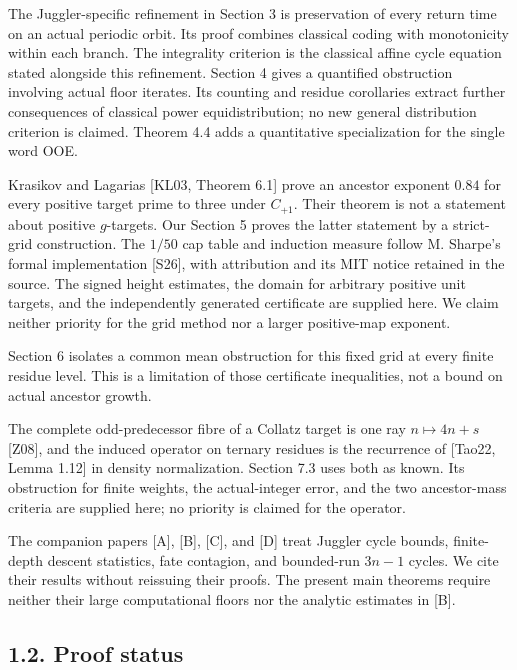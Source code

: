\documentclass[11pt,a4paper]{article}
\begin{document}
The Juggler-specific refinement in Section 3 is preservation of every
return time on an actual periodic orbit. Its proof combines classical
coding with monotonicity within each branch. The integrality criterion
is the classical affine cycle equation stated alongside this refinement.
Section 4 gives a quantified obstruction involving actual floor
iterates. Its counting and residue corollaries extract further
consequences of classical power equidistribution; no new general
distribution criterion is claimed. Theorem 4.4 adds a quantitative
specialization for the single word OOE.

Krasikov and Lagarias {[}KL03, Theorem 6.1{]} prove an ancestor exponent
\(0.84\) for every positive target prime to three under \(C_{+1}\).
Their theorem is not a statement about positive \(g\)-targets. Our
Section 5 proves the latter statement by a strict-grid construction. The
\(1/50\) cap table and induction measure follow M. Sharpe's formal
implementation {[}S26{]}, with attribution and its MIT notice retained
in the source. The signed height estimates, the domain for arbitrary
positive unit targets, and the independently generated certificate are
supplied here. We claim neither priority for the grid method nor a
larger positive-map exponent.

Section 6 isolates a common mean obstruction for this fixed grid at
every finite residue level. This is a limitation of those certificate
inequalities, not a bound on actual ancestor growth.

The complete odd-predecessor fibre of a Collatz target is one ray
\(n\mapsto4n+s\) {[}Z08{]}, and the induced operator on ternary residues
is the recurrence of {[}Tao22, Lemma 1.12{]} in density normalization.
Section 7.3 uses both as known. Its obstruction for finite weights, the
actual-integer error, and the two ancestor-mass criteria are supplied
here; no priority is claimed for the operator.

The companion papers {[}A{]}, {[}B{]}, {[}C{]}, and {[}D{]} treat
Juggler cycle bounds, finite-depth descent statistics, fate contagion,
and bounded-run \(3n-1\) cycles. We cite their results without reissuing
their proofs. The present main theorems require neither their large
computational floors nor the analytic estimates in {[}B{]}.

\subsection{1.2. Proof status}\label{proof-status}
\end{document}

